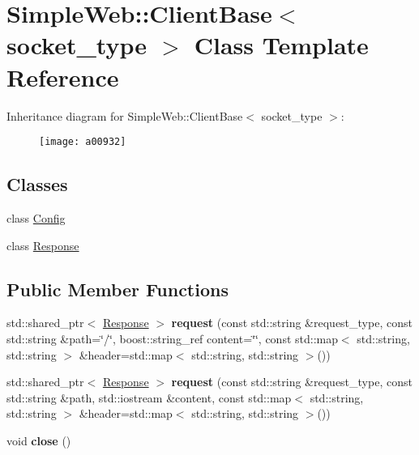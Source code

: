 \hypertarget{a00932}{}\section{Simple\+Web\+:\+:Client\+Base$<$ socket\+\_\+type $>$ Class Template Reference}
\label{a00932}
Inheritance diagram for Simple\+Web\+:\+:Client\+Base$<$ socket\+\_\+type $>$\+:\begin{figure}[H]
\begin{center}
\leavevmode
\texttt{[image: a00932]}
\end{center}
\end{figure}
\subsection*{Classes}
\begin{DoxyCompactItemize}
\item 
class \hyperlink{a00940}{Config}
\item 
class \hyperlink{a00936}{Response}
\end{DoxyCompactItemize}
\subsection*{Public Member Functions}
\begin{DoxyCompactItemize}
\item 
\mbox{\label{a00932_ac8a838ace77f0a1a19b8cb03bdba7e74}} 
std\+::shared\+\_\+ptr$<$ \hyperlink{a00936}{Response} $>$ {\bfseries request} (const std\+::string \&request\+\_\+type, const std\+::string \&path=\char`\"{}/\char`\"{}, boost\+::string\+\_\+ref content=\char`\"{}\char`\"{}, const std\+::map$<$ std\+::string, std\+::string $>$ \&header=std\+::map$<$ std\+::string, std\+::string $>$())
\item 
\mbox{\label{a00932_aca6cb17dbea9adf0cf1daf9d1ea70f76}} 
std\+::shared\+\_\+ptr$<$ \hyperlink{a00936}{Response} $>$ {\bfseries request} (const std\+::string \&request\+\_\+type, const std\+::string \&path, std\+::iostream \&content, const std\+::map$<$ std\+::string, std\+::string $>$ \&header=std\+::map$<$ std\+::string, std\+::string $>$())
\item 
\mbox{\label{a00932_ad21735a9bda2fae6aedd811efae981e1}} 
void {\bfseries close} ()
\end{DoxyCompactItemize}
